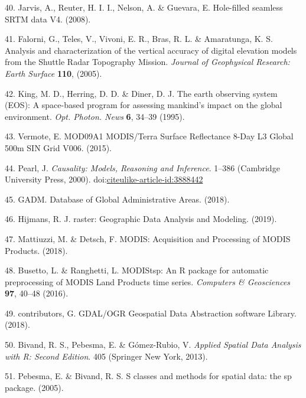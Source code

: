 \documentclass[12pt,oneside]{article}
\begin{document}
\leavevmode\hypertarget{ref-Jarvis_et_al_2008}{}%
40. Jarvis, A., Reuter, H. I. I., Nelson, A. \& Guevara, E. Hole-filled
seamless SRTM data V4. (2008).

\leavevmode\hypertarget{ref-Falorni_et_al_2005}{}%
41. Falorni, G., Teles, V., Vivoni, E. R., Bras, R. L. \& Amaratunga, K.
S. Analysis and characterization of the vertical accuracy of digital
elevation models from the Shuttle Radar Topography Mission.
\emph{Journal of Geophysical Research: Earth Surface} \textbf{110},
(2005).

\leavevmode\hypertarget{ref-King_et_al_1995}{}%
42. King, M. D., Herring, D. D. \& Diner, D. J. The earth observing
system (EOS): A space-based program for assessing mankind's impact on
the global environment. \emph{Opt. Photon. News} \textbf{6}, 34--39
(1995).

\leavevmode\hypertarget{ref-Vermote_2015}{}%
43. Vermote, E. MOD09A1 MODIS/Terra Surface Reflectance 8-Day L3 Global
500m SIN Grid V006. (2015).

\leavevmode\hypertarget{ref-Pearl_2000}{}%
44. Pearl, J. \emph{Causality: Models, Reasoning and Inference}. 1--386
(Cambridge University Press, 2000).
doi:\href{https://doi.org/citeulike-article-id:3888442}{citeulike-article-id:3888442}

\leavevmode\hypertarget{ref-GADM_2018}{}%
45. GADM. Database of Global Administrative Areas. (2018).

\leavevmode\hypertarget{ref-Hijmans_2019}{}%
46. Hijmans, R. J. raster: Geographic Data Analysis and Modeling.
(2019).

\leavevmode\hypertarget{ref-Mattiuzzi_and_Detsch_2018}{}%
47. Mattiuzzi, M. \& Detsch, F. MODIS: Acquisition and Processing of
MODIS Products. (2018).

\leavevmode\hypertarget{ref-Busetto_and_ranghetti_2016}{}%
48. Busetto, L. \& Ranghetti, L. MODIStsp: An R package for automatic
preprocessing of MODIS Land Products time series. \emph{Computers \&
Geosciences} \textbf{97}, 40--48 (2016).

\leavevmode\hypertarget{ref-GDAL_OGRcontributors_2018}{}%
49. contributors, G. GDAL/OGR Geospatial Data Abstraction software
Library. (2018).

\leavevmode\hypertarget{ref-Bivand_et_al_2013}{}%
50. Bivand, R. S., Pebesma, E. \& Gómez-Rubio, V. \emph{Applied Spatial
Data Analysis with R: Second Edition}. 405 (Springer New York, 2013).

\leavevmode\hypertarget{ref-Pebesma_Bivand_2005}{}%
51. Pebesma, E. \& Bivand, R. S. S classes and methods for spatial data:
the sp package. (2005).
\end{document}
